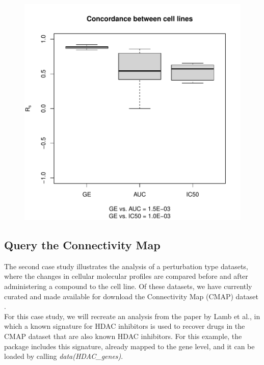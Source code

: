 \documentclass[11pt]{article}
\begin{document}
\begin{figure}[hbtp]
\begin{center}
\includegraphics{PharmacoGx-fig2}
\end{center}
\label{fig:one}
\end{figure}

\subsection{Query the Connectivity Map}

The second case study illustrates the analysis of a perturbation type datasets, where the changes in cellular molecular profiles are compared before and after administering a compound to the cell line. Of these datasets, we have currently curated and made available for download the Connectivity Map (CMAP) dataset \cite{lamb_connectivity_2006}. \\

For this case study, we will recreate an analysis from the paper by Lamb et al., in which a known signature for HDAC inhibitors \cite{glaser_gene_2003} is used to recover drugs in the CMAP dataset that are also known HDAC inhibitors. For this example, the package includes this signature, already mapped to the gene level, and it can be loaded by calling \textit{data(HDAC\_genes)}.
\end{document}
